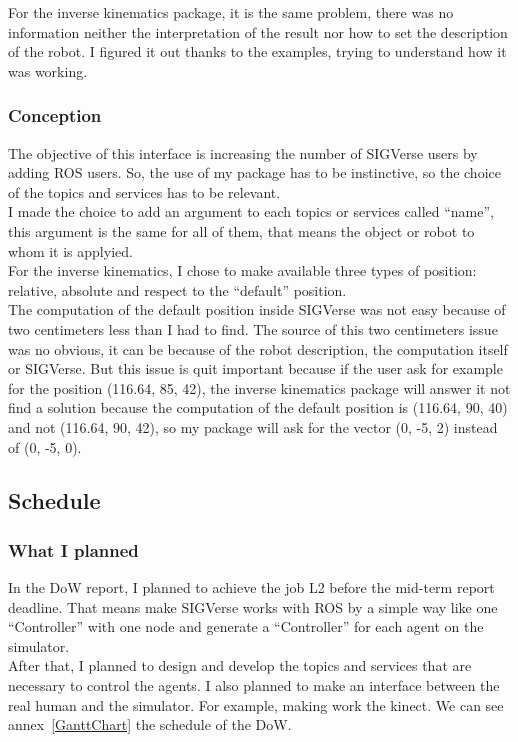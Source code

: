 For the inverse kinematics package, it is the same problem, there was no information neither the interpretation of the result nor how to set the description of the robot. I figured it out thanks to the examples, trying to understand how it was working.

\subsubsection{Conception}
The objective of this interface is increasing the number of SIGVerse users by adding ROS users. So, the use of my package has to be instinctive, so the choice of the topics and services has to be relevant.\\
I made the choice to add an argument to each topics or services called ``name'', this argument is the same for all of them, that means the object or robot to whom it is applyied.\\

For the inverse kinematics, I chose to make available three types of position: relative, absolute and respect to the ``default'' position.\\
The computation of the default position inside SIGVerse was not easy because of two centimeters less than I had to find. The source of this two centimeters issue was no obvious, it can be because of the robot description, the computation itself or SIGVerse. But this issue is quit important because if the user ask for example for the position (116.64, 85, 42), the inverse kinematics package will answer it not find a solution because the computation of the default position is (116.64, 90, 40) and not (116.64, 90, 42), so my package will ask for the vector (0, -5, 2) instead of (0, -5, 0).

\subsection{Schedule}
\subsubsection{What I planned}
In the DoW report, I planned to achieve the job L2 before the mid-term report deadline. That means make SIGVerse works with ROS by a simple way like one ``Controller'' with one node and generate a ``Controller'' for each agent on the simulator.\\

After that, I planned to design and develop the topics and services that are necessary to control the agents. I also planned to make an interface between the real human and the simulator. For example, making work the kinect. We can see annex~\ref{GanttChart} the schedule of the DoW.

